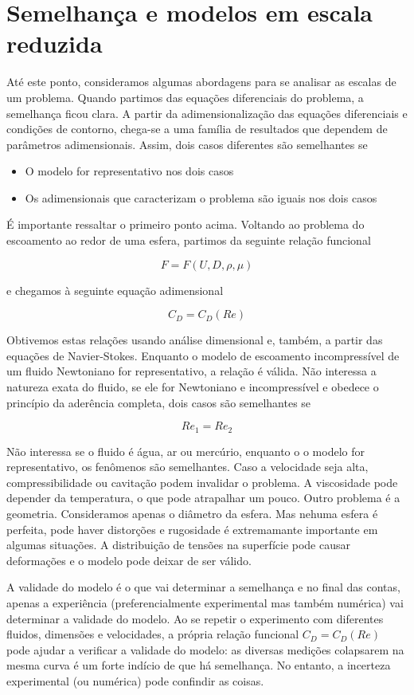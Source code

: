 \section{Semelhança e modelos em escala reduzida}

Até este ponto, consideramos algumas abordagens para se analisar as escalas de um problema. Quando partimos das equações diferenciais do problema, a semelhança ficou clara. A partir da adimensionalização das equações diferenciais e condições de contorno, chega-se a uma família de resultados que dependem de parâmetros adimensionais. Assim, dois casos diferentes são semelhantes se

\begin{itemize}
\item O modelo for representativo nos dois casos
\item Os adimensionais que caracterizam o problema são iguais nos dois casos
\end{itemize}

É importante ressaltar o primeiro ponto acima. Voltando ao problema do escoamento ao redor de uma esfera, partimos da seguinte relação funcional

\[
F = F(U, D, \rho, \mu)
\]

e chegamos à seguinte equação adimensional

\[
C_D = C_D(Re)
\]

Obtivemos estas relações usando análise dimensional e, também, a partir das equações de Navier-Stokes. Enquanto o modelo de escoamento incompressível de um fluido Newtoniano for representativo, a relação é válida. Não interessa a natureza exata do fluido, se ele for Newtoniano e incompressível e obedece o princípio da aderência completa, dois casos são semelhantes se

\[
Re_1 = Re_2
\]

Não interessa se o fluido é água, ar ou mercúrio, enquanto o o modelo for representativo, os fenômenos são semelhantes. Caso a velocidade seja alta, compressibilidade ou cavitação podem invalidar o problema. A viscosidade pode depender da temperatura, o que pode atrapalhar um pouco. Outro problema é a geometria. Consideramos apenas o diâmetro da esfera. Mas nehuma esfera é perfeita, pode haver distorções e rugosidade é extremamante importante em algumas situações. A distribuição de tensões na superfície pode causar deformações e o modelo pode deixar de ser válido.

A validade do modelo é o que vai determinar a semelhança e no final das contas, apenas a experiência (preferencialmente experimental mas também numérica) vai determinar a validade do modelo. Ao se repetir o experimento com diferentes fluidos, dimensões e velocidades, a própria relação funcional $C_D = C_D(Re)$ pode ajudar a verificar a validade do modelo: as diversas medições colapsarem na mesma curva é um forte indício de que há semelhança. No entanto, a incerteza experimental (ou numérica) pode confindir as coisas.

